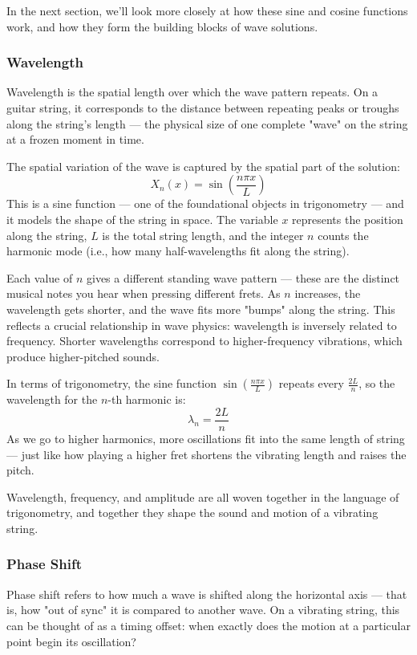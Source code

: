 In the next section, we’ll look more closely at how these sine and cosine functions work, and how they form the building blocks of wave solutions.
    
\subsubsection{Wavelength}

Wavelength is the spatial length over which the wave pattern repeats. On a guitar string, it corresponds to the distance between repeating peaks or troughs along the string’s length — the physical size of one complete "wave" on the string at a frozen moment in time.

The spatial variation of the wave is captured by the spatial part of the solution:
\[
X_n(x) = \sin\left(\frac{n\pi x}{L}\right)
\]
This is a sine function — one of the foundational objects in trigonometry — and it models the shape of the string in space. The variable \( x \) represents the position along the string, \( L \) is the total string length, and the integer \( n \) counts the harmonic mode (i.e., how many half-wavelengths fit along the string).

Each value of \( n \) gives a different standing wave pattern — these are the distinct musical notes you hear when pressing different frets. As \( n \) increases, the wavelength gets shorter, and the wave fits more "bumps" along the string. This reflects a crucial relationship in wave physics: wavelength is inversely related to frequency. Shorter wavelengths correspond to higher-frequency vibrations, which produce higher-pitched sounds.

In terms of trigonometry, the sine function \( \sin\left(\frac{n\pi x}{L} \right) \) repeats every \( \frac{2L}{n} \), so the wavelength for the \( n \)-th harmonic is:
\[
\lambda_n = \frac{2L}{n}
\]
As we go to higher harmonics, more oscillations fit into the same length of string — just like how playing a higher fret shortens the vibrating length and raises the pitch.

Wavelength, frequency, and amplitude are all woven together in the language of trigonometry, and together they shape the sound and motion of a vibrating string.

\subsubsection{Phase Shift}

Phase shift refers to how much a wave is shifted along the horizontal axis — that is, how "out of sync" it is compared to another wave. On a vibrating string, this can be thought of as a timing offset: when exactly does the motion at a particular point begin its oscillation?

